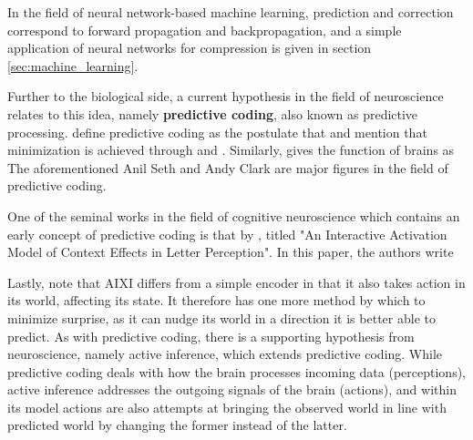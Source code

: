In the field of neural network-based machine learning, prediction and correction correspond to forward propagation and backpropagation, and a simple application of neural networks for compression is given in section \ref{sec:machine_learning}.

Further to the biological side, a current hypothesis in the field of neuroscience relates to this idea, namely \textbf{predictive coding}, also known as predictive processing. \textcite{millidge2021predictive} define predictive coding as the postulate that  and mention that minimization is achieved through  and . Similarly, \textcite{clark2013whatever} gives the function of brains as  The aforementioned Anil Seth and Andy Clark are major figures in the field of predictive coding.

One of the seminal works in the field of cognitive neuroscience which contains an early concept of predictive coding is that by \textcite{mcclelland1981interactive}, titled "An Interactive Activation Model of Context Effects in Letter Perception". In this paper, the authors write 

Lastly, note that AIXI differs from a simple encoder in that it also takes action in its world, affecting its state. It therefore has one more method by which to minimize surprise, as it can nudge its world in a direction it is better able to predict. As with predictive coding, there is a supporting hypothesis from neuroscience, namely active inference, which extends predictive coding. While predictive coding deals with how the brain processes incoming data (perceptions), active inference addresses the outgoing signals of the brain (actions), and within its model actions are also attempts at bringing the observed world in line with predicted world by changing the former instead of the latter.
